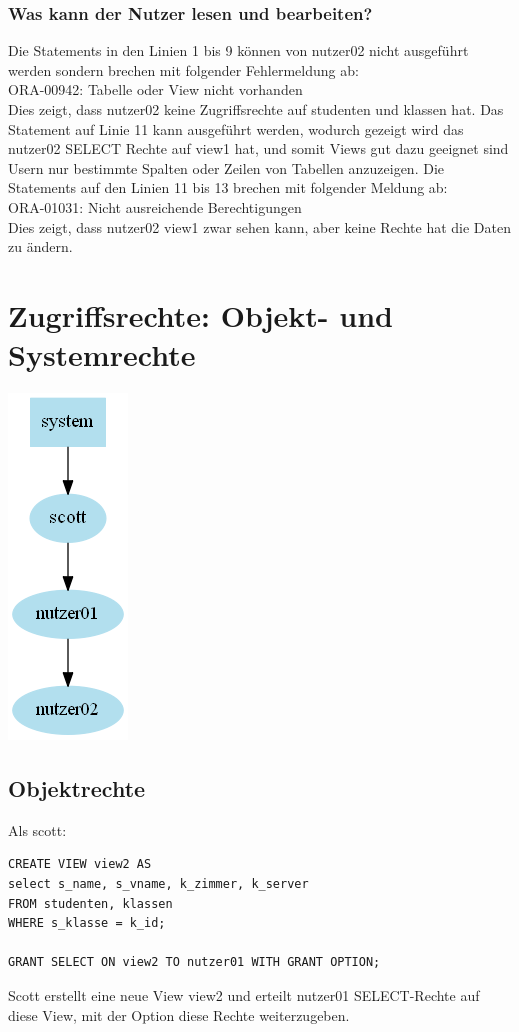 \documentclass[10pt]{scrreprt}
\begin{document}
\subsubsection{Was kann der Nutzer lesen und bearbeiten?}
Die Statements in den Linien 1 bis 9 können von nutzer02 nicht ausgeführt werden sondern brechen mit folgender Fehlermeldung ab:\\
ORA-00942: Tabelle oder View nicht vorhanden\\
Dies zeigt, dass nutzer02 keine Zugriffsrechte auf studenten und klassen hat.
Das Statement auf Linie 11 kann ausgeführt werden, wodurch gezeigt wird das nutzer02 SELECT Rechte auf view1 hat, und somit Views gut dazu geeignet sind Usern nur bestimmte Spalten oder Zeilen von Tabellen anzuzeigen.
Die Statements auf den Linien 11 bis 13 brechen mit folgender Meldung ab:\\
ORA-01031: Nicht ausreichende Berechtigungen\\
Dies zeigt, dass nutzer02 view1 zwar sehen kann, aber keine Rechte hat die Daten zu ändern.
\section{Zugriffsrechte: Objekt- und Systemrechte}
\begin{center}
\includegraphics[scale=0.5]{Oracle_Dependency.png}
\end{center}
\subsection{Objektrechte}
Als scott:
\begin{lstlisting}[style=sql]
CREATE VIEW view2 AS
select s_name, s_vname, k_zimmer, k_server
FROM studenten, klassen
WHERE s_klasse = k_id;

GRANT SELECT ON view2 TO nutzer01 WITH GRANT OPTION;
\end{lstlisting}
Scott erstellt eine neue View view2 und erteilt nutzer01 SELECT-Rechte auf diese View, mit der Option diese Rechte weiterzugeben.
\end{document}
